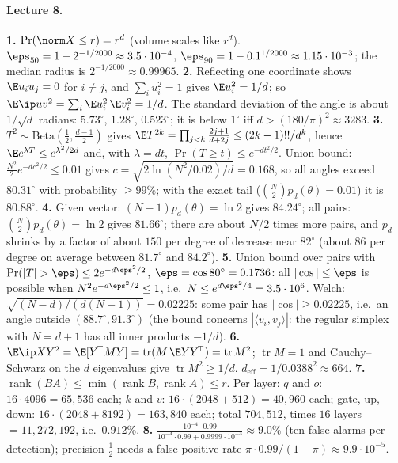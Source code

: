 \paragraph{Lecture 8.}
\textbf{1.} $\Pr(\norm X\le r)=r^d$ (volume scales like $r^d$). $\eps_{50}=1-2^{-1/2000}\approx3.5\cdot10^{-4}$, $\eps_{90}=1-0.1^{1/2000}\approx1.15\cdot10^{-3}$; the median radius is $2^{-1/2000}\approx0.99965$. \quad
\textbf{2.} Reflecting one coordinate shows $\E u_iu_j=0$ for $i\ne j$, and $\sum_iu_i^2=1$ gives $\E u_i^2=1/d$; so $\E\ip uv^2=\sum_i\E u_i^2\,\E v_i^2=1/d$. The standard deviation of the angle is about $1/\sqrt d$ radians: $5.73^\circ$, $1.28^\circ$, $0.523^\circ$; it is below $1^\circ$ iff $d>(180/\pi)^2\approx3283$. \quad
\textbf{3.} $T^2\sim\mathrm{Beta}(\frac12,\frac{d-1}2)$ gives $\E T^{2k}=\prod_{j<k}\frac{2j+1}{d+2j}\le(2k-1)!!/d^k$, hence $\E e^{\lambda T}\le e^{\lambda^2/2d}$ and, with $\lambda=dt$, $\Pr(T\ge t)\le e^{-dt^2/2}$. Union bound: $\frac{N^2}2e^{-dc^2/2}\le0.01$ gives $c=\sqrt{2\ln(N^2/0.02)/d}=0.168$, so all angles exceed $80.31^\circ$ with probability $\ge99\%$; with the exact tail ($\binom N2p_d(\theta)=0.01$) it is $80.88^\circ$. \quad
\textbf{4.} Given vector: $(N-1)p_d(\theta)=\ln2$ gives $84.24^\circ$; all pairs: $\binom N2p_d(\theta)=\ln2$ gives $81.66^\circ$; there are about $N/2$ times more pairs, and $p_d$ shrinks by a factor of about $150$ per degree of decrease near $82^\circ$ (about $86$ per degree on average between $81.7^\circ$ and $84.2^\circ$). \quad
\textbf{5.} Union bound over pairs with $\Pr(|T|>\eps)\le2e^{-d\eps^2/2}$, $\eps=\cos80^\circ=0.1736$: all $|\cos|\le\eps$ is possible when $N^2e^{-d\eps^2/2}\le1$, i.e.\ $N\le e^{d\eps^2/4}=3.5\cdot10^6$. Welch: $\sqrt{(N-d)/(d(N-1))}=0.02225$: some pair has $|\cos|\ge0.02225$, i.e.\ an angle outside $(88.7^\circ,91.3^\circ)$ (the bound concerns $|\langle v_i,v_j\rangle|$: the regular simplex with $N=d+1$ has all inner products $-1/d$). \quad
\textbf{6.} $\E\ip XY^2=\E[Y^{\!\top}MY]=\operatorname{tr}(M\,\E YY^{\!\top})=\operatorname{tr}M^2$; $\operatorname{tr}M=1$ and Cauchy--Schwarz on the $d$ eigenvalues give $\operatorname{tr}M^2\ge1/d$. $d_{\mathrm{eff}}=1/0.0388^2\approx664$. \quad
\textbf{7.} $\operatorname{rank}(BA)\le\min(\operatorname{rank}B,\operatorname{rank}A)\le r$. Per layer: $q$ and $o$: $16\cdot4096=65{,}536$ each; $k$ and $v$: $16\cdot(2048+512)=40{,}960$ each; gate, up, down: $16\cdot(2048+8192)=163{,}840$ each; total $704{,}512$, times $16$ layers $=11{,}272{,}192$, i.e.\ $0.912\%$. \quad
\textbf{8.} $\frac{10^{-4}\cdot0.99}{10^{-4}\cdot0.99+0.9999\cdot10^{-3}}\approx9.0\%$ (ten false alarms per detection); precision $\frac12$ needs a false-positive rate $\pi\cdot0.99/(1-\pi)\approx9.9\cdot10^{-5}$. \quad

